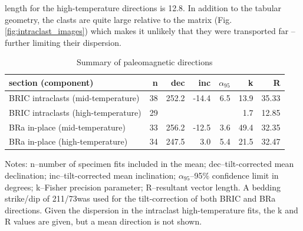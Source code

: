 \documentclass[draft]{agujournal2018}
\begin{document}
length for the high-temperature directions is 12.8. In addition to the tabular geometry, the clasts are quite large relative to the matrix (Fig. \ref{fig:intraclast_images}) which makes it unlikely that they were transported far -- further limiting their dispersion.

\begin{table}[h!]
\footnotesize
\caption{Summary of paleomagnetic directions}
\begin{tabular}{|l|r|r|r|r|r|r|}
\hline
section (component) & n & dec & inc & $\alpha_{95}$ & k & R \\
\hline
BRIC intraclasts (mid-temperature) & 38 & 252.2 &  -14.4 & 6.5 & 13.9 &  35.33  \\
BRIC intraclasts (high-temperature) & 29 &  &   &  & 1.7 &  12.85  \\
BRa in-place (mid-temperature) & 33 & 256.2 &  -12.5 & 3.6 & 49.4 &  32.35  \\
BRa in-place (high-temperature) & 34 & 247.5 &  3.0 & 5.4 & 21.5 &  32.47  \\
\hline
\end{tabular}
\begin{tablenotes}
Notes: n--number of specimen fits included in the mean; dec--tilt-corrected mean declination; inc--tilt-corrected mean inclination; $\alpha_{95}$--95$\%$ confidence limit in degrees; k--Fisher precision parameter; R--resultant vector length. A bedding strike/dip of 211\textdegree/73\textdegree was used for the tilt-correction of both BRIC and BRa directions. Given the dispersion in the intraclast high-temperature fits, the k and R values are given, but a mean direction is not shown.
\end{tablenotes}

\label{tab:pmag_sites}
\end{table}
\end{document}
